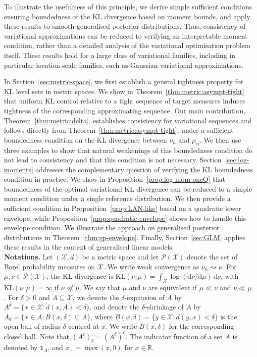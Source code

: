 \documentclass[11pt]{article}
\theoremstyle{plain}
\theoremstyle{definition}
\theoremstyle{remark}
\begin{document}
To illustrate the usefulness of this principle, we derive simple sufficient conditions ensuring boundedness of the KL divergence based on moment bounds, and apply these results to smooth generalised posterior distributions. Thus, consistency of variational approximations can be reduced to verifying an interpretable moment condition, rather than a detailed analysis of the variational optimisation problem itself. These results hold for a large class of variational families, including in particular location-scale families, such as Gaussian variational approximations.

In Section~\ref{sec:metric-space}, we first establish a general tightness property for KL level sets in metric spaces. We show in Theorem~\ref{thm:metric:asympt-tight} that uniform KL control relative to a tight sequence of target measures induces tightness of the corresponding approximating sequence.
Our main contribution, Theorem~\ref{thm:metric:delta}, establishes consistency for variational sequences and follows directly from Theorem~\ref{thm:metric:asympt-tight}, under a sufficient boundedness condition on the KL divergence between $\nu_n$ and $\mu_n$. We then use three examples to show that natural weakenings of this boundedness condition do not lead to consistency and that this condition is not necessary.
Section~\ref{sec:log-moments} addresses the complementary question of verifying the KL boundedness condition in practice. We show in Proposition~\ref{prop:log-mom-oneQ} that boundedness of the optimal variational KL divergence can be reduced to a simple moment condition under a single reference distribution. We then provide a sufficient condition in Proposition~\ref{prop:LAN-like} based on a quadratic lower envelope, while Proposition~\ref{prop:quadratic-envelope} shows how to handle this envelope condition. We illustrate the approach on generalised posterior distributions in Theorem~\ref{thm:gp-envelope}. Finally, Section~\ref{sec:GLM} applies these results in the context of generalised linear models.\\

\noindent\textbf{Notations.} Let $(\mathcal X,d)$ be a metric space and let $\mathcal P(\mathcal X)$ denote the set of Borel probability measures on $\mathcal X$.
We write weak convergence as $\nu_n\rightsquigarrow\nu$.
For $\mu,\nu\in\mathcal P(\mathcal X)$, the KL divergence is
$\mathrm{KL}(\nu\Vert\mu)=\int_{\mathcal X}\log({\mathrm{d}\nu}/{\mathrm{d}\mu})\,\mathrm{d}\nu$,
with $\mathrm{KL}(\nu\Vert\mu)=\infty$ if $\nu\not\ll\mu$.
We say that $\mu$ and $\nu$ are equivalent if $\mu\ll\nu$ and $\nu\ll\mu$.
For $\delta>0$ and $A\subseteq \mathcal X$, we denote the $\delta$-expansion of $A$ by $A^\delta = \{x\in\mathcal X: d(x,A) < \delta\}$, and denote the $\delta$-shrinkage of $A$ by $A_\delta = \{x\in A: B(x,\delta)\subseteq A\}$, where $B(x,\delta)=\{y\in\mathcal X:d(y,x)<\delta\}$ is the open ball of radius $\delta$ centred at $x$. We write $\overline{B}(x,\delta)$ for the corresponding closed ball. Note that $(A^c)_\delta = (A^\delta)^c$. The indicator function of a set $A$ is denoted by $\mathds{1}_A$, and $x_+=\max(x,0)$ for $x\in\mathbb R$.
\end{document}
